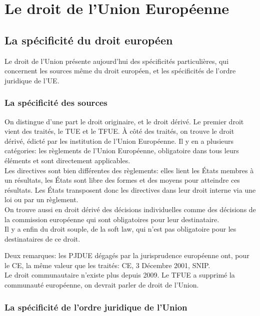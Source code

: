 \documentclass[10pt, a4paper, openany]{book}
\begin{document}
\chapter{Le droit de l'Union Européenne}

\section{La spécificité du droit européen}

Le droit de l'Union présente aujourd'hui des spécificités particulières, qui concernent les sources même du droit européen, et les spécificités de l'ordre juridique de l'UE. 

\subsection{La spécificité des sources}

On distingue d'une part le droit originaire, et le droit dérivé. Le premier droit vient des traités, le TUE et le TFUE. À côté des traités, on trouve le droit dérivé, édicté par les institution de l'Union Européenne. Il y en a plusieurs catégories: les règlements de l'Union Européenne, obligatoire dans tous leurs éléments et sont directement applicables. \\
Les directives sont bien différentes des règlements: elles lient les États membres à un résultats, les États sont libre des formes et des moyens pour atteindre ces résultats. Les États transposent donc les directives dans leur droit interne via une loi ou par un règlement. \\
On trouve aussi en droit dérivé des décisions individuelles comme des décisions de la commission européenne qui sont obligatoires pour leur destinataire. \\
Il y a enfin du droit souple, de la soft law, qui n'est pas obligatoire pour les destinataires de ce droit. 


Deux remarques: les PJDUE dégagés par la jurisprudence européenne ont, pour le CE, la même valeur que les traités: CE, 3 Décembre 2001, SNIP. \\
Le droit communautaire n'existe plus depuis 2009. Le TFUE a supprimé la communauté européenne, on devrait parler de droit de l'Union. 

\subsection{La spécificité de l'ordre juridique de l'Union}
\end{document}

